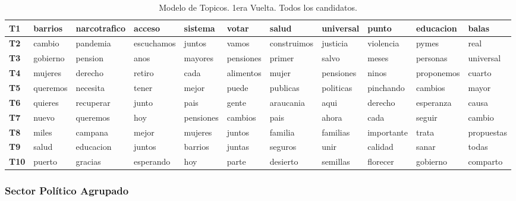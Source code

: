 \documentclass[
  10pt,
  letterpaper,
]{report}
\begin{document}
\begin{table}[!h]

\caption{\label{tab:Tabla9b_pc}Modelo de Topicos. 1era Vuelta. Todos los candidatos.}
\centering
\fontsize{6}{8}\selectfont
\begin{tabular}[t]{>{\raggedright\arraybackslash}p{0.08in}|>{\raggedright\arraybackslash}p{0.4in}|>{\raggedright\arraybackslash}p{0.4in}|>{\raggedright\arraybackslash}p{0.4in}|>{\raggedright\arraybackslash}p{0.4in}|>{\raggedright\arraybackslash}p{0.4in}|>{\raggedright\arraybackslash}p{0.4in}|>{\raggedright\arraybackslash}p{0.4in}|>{\raggedright\arraybackslash}p{0.4in}|>{\raggedright\arraybackslash}p{0.4in}|l}
\hline
T1 & barrios & narcotrafico & acceso & sistema & votar & salud & universal & punto & educacion & balas\\
\hline
\textbf{T2} & cambio & pandemia & escuchamos & juntos & vamos & construimos & justicia & violencia & pymes & real\\
\hline
\textbf{T3} & gobierno & pension & anos & mayores & pensiones & primer & salvo & meses & personas & universal\\
\hline
\textbf{T4} & mujeres & derecho & retiro & cada & alimentos & mujer & pensiones & ninos & proponemos & cuarto\\
\hline
\textbf{T5} & queremos & necesita & tener & mejor & puede & publicas & politicas & pinchando & cambios & mayor\\
\hline
\textbf{T6} & quieres & recuperar & junto & pais & gente & araucania & aqui & derecho & esperanza & causa\\
\hline
\textbf{T7} & nuevo & queremos & hoy & pensiones & cambios & pais & ahora & cada & seguir & cambio\\
\hline
\textbf{T8} & miles & campana & mejor & mujeres & juntos & familia & familias & importante & trata & propuestas\\
\hline
\textbf{T9} & salud & educacion & juntos & barrios & juntas & seguros & unir & calidad & sanar & todas\\
\hline
\textbf{T10} & puerto & gracias & esperando & hoy & parte & desierto & semillas & florecer & gobierno & comparto\\
\hline
\end{tabular}
\end{table}

\hypertarget{sector-poluxedtico-agrupado}{%
\subsubsection{Sector Político
Agrupado}\label{sector-poluxedtico-agrupado}}
\end{document}
